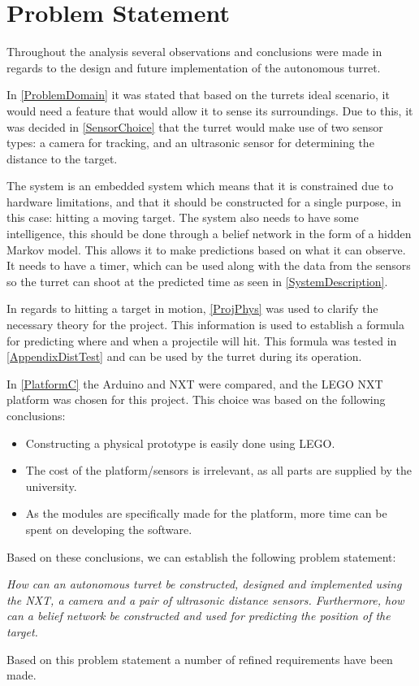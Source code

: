 \chapter{Problem Statement}

Throughout the analysis several observations and conclusions were made in
regards to the design and future implementation of the autonomous turret. 

In \autoref{ProblemDomain} it was stated that based on the turrets ideal
scenario, it would need a feature that would allow it to sense its
surroundings. Due to this, it was decided in \autoref{SensorChoice} that the
turret would make use of two sensor types: a camera for tracking, and an
ultrasonic sensor for determining the distance to the target.\nl

The system is an embedded system which means that it is constrained due to
hardware limitations, and that it should be constructed for a single purpose,
in this case: hitting a moving target. The system also needs to have some
intelligence, this should be done through a belief network in the form of a
hidden Markov model. This allows it to make predictions based on what it can
observe. It needs to have a timer, which can be used along with the data from
the sensors so the turret can shoot at the predicted time as seen in
\autoref{SystemDescription}.\nl

In regards to hitting a target in motion, \autoref{ProjPhys} was used to
clarify the necessary theory for the project. This information is used to
establish a formula for predicting where and when a projectile will hit. This
formula was tested in \autoref{AppendixDistTest} and can be used by the turret
during its operation.\nl

In \autoref{PlatformC} the Arduino and NXT were compared, and the LEGO NXT
platform was chosen for this project. This choice was
based on the following conclusions:
\begin{itemize}
  \item Constructing a physical prototype is easily done using LEGO.
  \item The cost of the platform/sensors is irrelevant, as all parts are
  supplied by the university.
  \item As the modules are specifically made for the platform, more time can be
  spent on developing the software.
\end{itemize}

Based on these conclusions, we can establish the following
problem statement:

\begin{center}
\begin{minipage}{0.8\linewidth}
\textit{How can an autonomous turret be constructed, designed and implemented
using the NXT, a camera and a pair of ultrasonic distance sensors. Furthermore,
how can a belief network be constructed and used for predicting the position
of the target.}
\end{minipage}
\end{center}

Based on this problem statement a number of refined requirements have been made.
